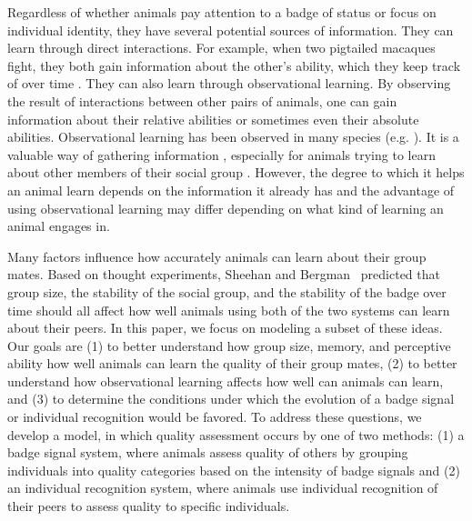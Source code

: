Regardless of whether animals pay attention to a badge of status or focus on individual identity, they have several potential sources of information. They can learn through direct interactions. For example, when two pigtailed macaques fight, they both gain information about the other's ability, which they keep track of over time \cite{Flack:2007kx,Flack:2006uq}. They can also learn through observational learning. By observing the result of interactions between other pairs of animals, one can gain information about their relative abilities or sometimes even their absolute abilities. Observational learning has been observed in many species (e.g. \cite{Holekamp:1991nx,Hobson:2015uq,Fiorito:1992ve,Bugnyar:2002qf,Hopper:2008bh,Marchetti:2000dq,Gaudet:1984cr}). It is a valuable way of gathering information \cite{Holekamp:1991nx,Schaik:2011oq}, especially for animals trying to learn about other members of their social group \cite{Freeman:1985kl,Holekamp:1991nx,Hobson:2015uq}. However, the degree to which it helps an animal learn depends on the information it already has and the advantage of using observational learning may differ depending on what kind of learning an animal engages in.

Many factors influence how accurately animals can learn about their group mates. Based on  thought experiments, Sheehan and Bergman~\cite{sheehan2016evotradeoff} predicted that group size, the stability of the social group, and the stability of the badge over time should all affect how well animals using both of the two systems can learn about their peers. In this paper, we focus on modeling a subset of these ideas. Our goals are (1) to better understand how group size, memory, and perceptive ability how well animals can learn the quality of their group mates, (2) to better understand how observational learning affects how well can animals can learn, and (3) to determine the conditions under which the evolution of a badge signal or individual recognition would be favored. To address these questions, we develop a model, in which quality assessment occurs by one of two methods: (1) a badge signal system, where animals assess quality of others by grouping individuals into quality categories based on the intensity of badge signals and (2) an individual recognition system, where animals use individual recognition of their peers to assess quality to specific individuals.  


